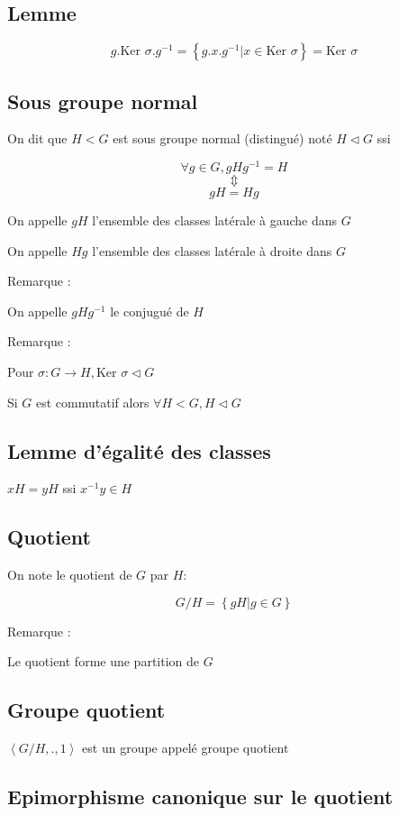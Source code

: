 \documentclass[a4paper,10pt]{article}
\newcommand{\Ker}{\mbox{Ker }}
\newcommand{\grp}[1]{\left\langle #1 \right\rangle}
\newcommand{\ap}{\rightarrow}
\newcommand{\tset}[1]{\left\lbrace #1 \right\rbrace}
\newcommand{\normal}{\triangleleft}
\begin{document}
\subsection{Lemme}

$$g.\Ker \sigma.g^{-1} = \tset{g.x.g^{-1} \vert x \in \Ker \sigma} = \Ker \sigma$$

\subsection{Sous groupe normal}

On dit que $H < G$ est sous groupe normal (distingué) noté $H \normal G$ ssi 

$$\forall g \in G, g H g^{-1} = H$$
$$\Updownarrow$$
$$gH = Hg$$

On appelle $gH$ l'ensemble des classes latérale à gauche dans $G$

On appelle $Hg$ l'ensemble des classes latérale à droite dans $G$

Remarque :

On appelle $g H g^{-1}$ le conjugué de $H$

Remarque : 

Pour $\sigma: G \ap H, \Ker \sigma \normal G$

Si $G$ est commutatif alors $\forall H < G, H \normal G$

\subsection{Lemme d'égalité des classes}

$xH = yH$ ssi $x^{-1}y \in H$

\subsection{Quotient}

On note le quotient de $G$ par $H$:

$$G/H = \tset{gH \vert g \in G}$$

Remarque :

Le quotient forme une partition de $G$

\subsection{Groupe quotient}

$\grp{G/H,.,1}$ est un groupe appelé groupe quotient

\subsection{Epimorphisme canonique sur le quotient}
\end{document}
